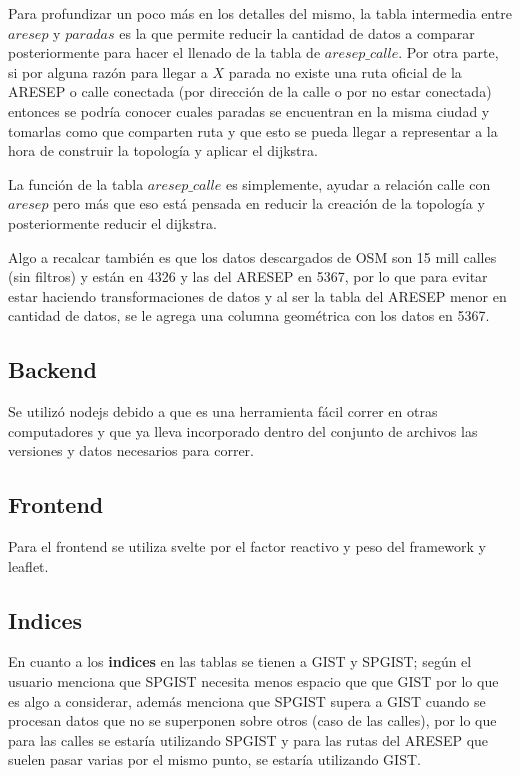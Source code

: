 Para profundizar un poco más en los detalles del mismo, la tabla intermedia entre $aresep$ y $paradas$ es la que permite reducir la cantidad de datos a comparar posteriormente para hacer el llenado de la tabla de $aresep\_calle$.
Por otra parte, si por alguna razón para llegar a $X$ parada no existe una ruta oficial de la ARESEP o calle conectada (por dirección de la calle o por no estar conectada) entonces se podría conocer cuales paradas se encuentran en la misma ciudad y tomarlas como que comparten ruta y que esto se pueda llegar a representar a la hora de construir la topología y aplicar el dijkstra.

La función de la tabla $aresep\_calle$ es simplemente, ayudar a relación calle con $aresep$ pero más que eso está pensada en reducir la creación de la topología y posteriormente reducir el dijkstra.

Algo a recalcar también es que los datos descargados de OSM son 15 mill calles (sin filtros) y están en 4326 y las del ARESEP en 5367, por lo que para evitar estar haciendo transformaciones de datos y al ser la tabla del ARESEP menor en cantidad de datos, se le agrega una columna geométrica con los datos en 5367.

\subsection{Backend}
Se utilizó nodejs debido a que es una herramienta fácil correr en otras computadores y que ya lleva incorporado dentro del conjunto de archivos las versiones y datos necesarios para correr.

\subsection{Frontend}
Para el frontend se utiliza svelte por el factor reactivo y peso del framework y leaflet. 

\subsection{Indices}
En cuanto a los \textbf{indices} en las tablas se tienen a GIST y SPGIST; según el usuario \textcite{geozelot} menciona que SPGIST necesita menos espacio que que GIST por lo que es algo a considerar, además \textcite{Ramsey} menciona  que SPGIST supera a GIST cuando se procesan datos que no se superponen sobre otros (caso de las calles), por lo que para las calles se estaría utilizando SPGIST y para las rutas del ARESEP que suelen pasar varias por el mismo punto, se estaría utilizando GIST.

